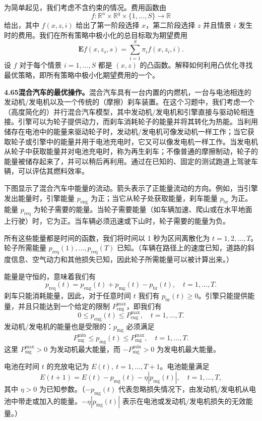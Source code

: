 \documentclass[UTF8, 12pt, fontset=fandol, oneside]{ctexart}
\begin{document}
为简单起见，我们考虑不含约束的情况。费用函数由
\[
f:\mathbb{R}^n\times\mathbb{R}^q\times\{1,\ldots,S\}\to\mathbb{R}
\]
给出，其中 $f(x,z,i)$ 给出了第一阶段选择 $x$，第二阶段选择 $z$ 并且情景 $i$ 发生时的费用。我们在所有策略中极小化的总目标取为期望费用
\[
\mathbf{E}f(x,z_s,s)=\sum_{i=1}^S\pi_if(x,z_i,i).
\]
设 $f$ 对于每个情景 $i=1,\ldots,S$ 都是 $(x,z)$ 的凸函数。解释如何利用凸优化寻找最优策略，即所有策略中极小化期望费用的一个。

\noindent\textbf{4.65\quad 混合汽车的最优操作。}\quad 混合汽车具有一台内置的内燃机，一台与电池相连的发动机/发电机以及一个传统的（摩擦）刹车装置。在这个习题中，我们考虑一个（高度简化的）并行混合汽车模型，其中发动机/发电机和引擎直接与驱动轮相连接。引擎可以为轮子提供动力，而刹车消耗轮子的能量并将其转化为热能。当利用储存在电池中的能量来驱动轮子时，发动机/发电机可像发动机一样工作；当它获取轮子或引擎中的能量并用于电池充电时，它又可以像发电机一样工作。当发电机从轮子中获取能量并对电池充电时，称为再生刹车；不像普通的摩擦制动，轮子的能量被储存起来了，并可以稍后再利用。通过在已知的、固定的测试跑道上驾驶车辆，可以评估其燃料效率。

下图显示了混合汽车中能量的流动。箭头表示了正能量流动的方向。例如，当引擎发出能量时，引擎能量 $p_{\mathrm{eng}}$ 为正；当它从轮子处获取能量，刹车能量 $p_{\mathrm{br}}$ 为正。能量 $p_{\mathrm{req}}$ 为轮子需要的能量。当轮子需要能量（如车辆加速、爬山或在水平地面上行驶）时，它为正。当车辆必须迅速或下山时，轮子需要的能量为负。

所有这些能量都是时间的函数，我们将时间以 1 秒为区间离散化为 $t=1,2,\ldots,T$。轮子所需能量 $p_{\mathrm{req}}(1),\ldots,p_{\mathrm{req}}(T)$ 已知。（车辆在路径上的速度已知，道路的斜度信息、空气动力和其他损失已知，因此轮子所需能量可以被计算出来。）

能量是守恒的，意味着我们有
\[
p_{\mathrm{req}}(t)=p_{\mathrm{eng}}(t)+p_{\mathrm{mg}}(t)-p_{\mathrm{br}}(t),\quad t=1,\ldots,T.
\]
刹车只能消耗能量，因此，对于任意时间 $t$ 我们有 $p_{\mathrm{br}}(t)\geq0$。引擎只能提供能量，并且只能达到一个给定的限制 $P_{\mathrm{eng}}^{\max}$，即我们有
\[
0\leq p_{\mathrm{eng}}(t)\leq P_{\mathrm{eng}}^{\max},\quad t=1,\ldots,T.
\]
发动机/发电机的能量也是受限的：$p_{\mathrm{mg}}$ 必须满足
\[
P_{\mathrm{mg}}^{\min}\leq p_{\mathrm{mg}}(t)\leq P_{\mathrm{mg}}^{\max},\quad t=1,\ldots,T.
\]
这里 $P_{\mathrm{mg}}^{\max}>0$ 为发动机最大能量，而 $-P_{\mathrm{mg}}^{\min}>0$ 为发电机最大能量。

电池在时间 $t$ 的充放电记为 $E(t),\ t=1,\ldots,T+1$。电池能量满足
\[
E(t+1)=E(t)-p_{\mathrm{mg}}(t)-\eta|p_{\mathrm{mg}}(t)|,\quad t=1,\ldots,T,
\]
其中 $\eta>0$ 为已知参数。（$-p_{\mathrm{mg}}(t)$ 代表忽略损失情况下，由发动机/发电机从电池中带走或加入的能量。$-\eta|p_{\mathrm{mg}}(t)|$ 表示在电池或发动机/发电机损失的无效能量。）
\end{document}
